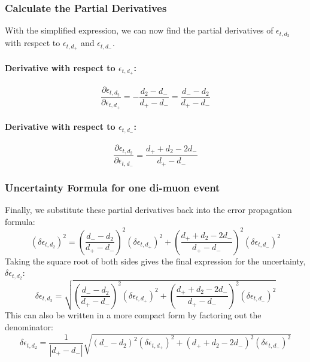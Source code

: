 \documentclass[11pt]{article}
\begin{document}
\subsubsection{Calculate the Partial Derivatives}

With the simplified expression, we can now find the partial derivatives of $\epsilon_{t,d_{2}}$ with respect to $\epsilon_{t,d_{+}}$ and $\epsilon_{t,d_{-}}$.

\paragraph{Derivative with respect to $\epsilon_{t,d_{+}}$:}
$$
\frac{\partial \epsilon_{t,d_{2}}}{\partial \epsilon_{t,d_{+}}} = -\frac{d_2 - d_-}{d_+ - d_-} = \frac{d_- - d_2}{d_+ - d_-}
$$

\paragraph{Derivative with respect to $\epsilon_{t,d_{-}}$:}
$$
\frac{\partial \epsilon_{t,d_{2}}}{\partial \epsilon_{t,d_{-}}} = \frac{d_+ + d_2 - 2d_-}{d_+ - d_-}
$$

\subsubsection{Uncertainty Formula for one di-muon event}

Finally, we substitute these partial derivatives back into the error propagation formula:
$$
(\delta\epsilon_{t,d_{2}})^2 = \left(\frac{d_- - d_2}{d_+ - d_-}\right)^2 (\delta\epsilon_{t,d_{+}})^2 + \left(\frac{d_+ + d_2 - 2d_-}{d_+ - d_-}\right)^2 (\delta\epsilon_{t,d_{-}})^2
$$
Taking the square root of both sides gives the final expression for the uncertainty, $\delta\epsilon_{t,d_{2}}$:
$$
\delta\epsilon_{t,d_{2}} = \sqrt{\left(\frac{d_- - d_2}{d_+ - d_-}\right)^2 (\delta\epsilon_{t,d_{+}})^2 + \left(\frac{d_+ + d_2 - 2d_-}{d_+ - d_-}\right)^2 (\delta\epsilon_{t,d_{-}})^2}
$$
This can also be written in a more compact form by factoring out the denominator:
$$
\delta\epsilon_{t,d_{2}} = \frac{1}{|d_+ - d_-|} \sqrt{(d_- - d_2)^2 (\delta\epsilon_{t,d_{+}})^2 + (d_+ + d_2 - 2d_-)^2 (\delta\epsilon_{t,d_{-}})^2}
$$
\clearpage
\end{document}
